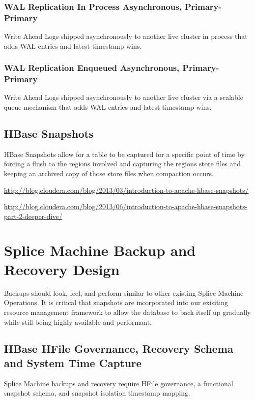 \subsubsection{WAL Replication In Process Asynchronous, Primary-Primary}

Write Ahead Logs shipped asynchronously to another live cluster in process that
adds WAL entries and latest timestamp wins.

\subsubsection{WAL Replication Enqueued Asynchronous, Primary-Primary}

Write Ahead Logs shipped asynchronously to another live cluster via a scalable
queue mechanism that adds WAL entries and latest timestamp wins.


\subsection{HBase Snapshots}

HBase Snapshots allow for a table to be captured for a specific point of time
by forcing a flush to the regions involved and capturing the regions store
files and keeping an archived copy of those store files when compaction occurs. 

\url{http://blog.cloudera.com/blog/2013/03/introduction-to-apache-hbase-snapshots/}

\url{http://blog.cloudera.com/blog/2013/06/introduction-to-apache-hbase-snapshots-part-2-deeper-dive/}

\section{Splice Machine Backup and Recovery Design}

Backups should look, feel, and perform similar to other existing Splice Machine
Operations.  It is critical that snapshots are incorporated into our exisiting
resource management framework to allow the database to back itself up gradually
while still being highly available and performant.

\subsection{HBase HFile Governance, Recovery Schema and System Time Capture}

Splice Machine backups and recovery require HFile governance, a functional
snapshot schema, and snapshot isolation timestamp mapping.

